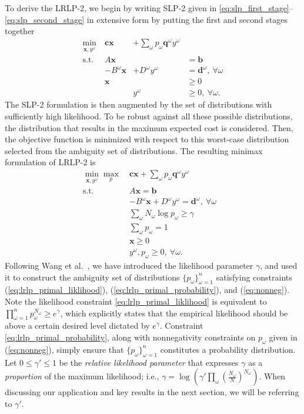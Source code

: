 \documentclass[12pt]{amsart}
\newcommand{\x}{\mathbf{x}}
\renewcommand{\c}{\mathbf{c}}
\newcommand{\q}{\mathbf{q}}
\renewcommand{\b}{\mathbf{b}}
\renewcommand{\d}{\mathbf{d}}
\newcommand{\st}{\mbox{s.t.}}
\begin{document}
To derive the LRLP-2, we begin by writing SLP-2 given in \eqref{eq:slp_first_stage}--\eqref{eq:slp_second_stage} in extensive form by putting the first and second stages together
\[
	\begin{array}{rrrl}
		\min_{\x,y^\omega} \ & \c\x & + \sum_\omega p_\omega \q^\omega y^\omega \label{eq:slp2cost} \\
		\st \ & A\x & & = \b \nonumber \\
		& -B^\omega \x & + D^\omega y^\omega & = \d^\omega,\ \forall \omega \nonumber \\
		& \x & & \geq 0 \nonumber \\
		& & y^\omega & \geq 0,\ \forall \omega. \nonumber
	\end{array}
\]
The SLP-2 formulation is then augmented by the set of distributions with sufficiently high likelihood.
To be robust against all these possible distributions, the distribution that results in the maximum expected cost is considered.
Then, the objective function is minimized with respect to this worst-case distribution selected from the ambiguity set of distributions.
The resulting minimax formulation of LRLP-2 is
\begin{align}
	\min_{\x,y^\omega} \max_p \ & \c\x + \sum_\omega p_\omega \q^\omega y^\omega \label{eq:lrlp_primal}\\
	\st \ & A\x = \b \nonumber \\
	& -B^\omega \x + D^\omega y^\omega = \d^\omega,\ \forall \omega \nonumber \\
	& \sum_\omega N_\omega \log p_\omega \geq \gamma &   \label{eq:lrlp_primal_liklihood} \\
	& \sum_\omega p_\omega = 1 &   \label{eq:lrlp_primal_probability} \\
	& \x \geq 0 \nonumber \\
	& y^\omega, p_\omega \geq 0,\ \forall \omega. \label{eq:nonneg}
\end{align}
Following Wang et al.\ \cite{wang2010likelihood}, we have introduced the likelihood parameter $\gamma$, and used it to construct the ambiguity set of distributions $\{p_\omega\}_{\omega=1}^{n}$ satisfying constraints (\ref{eq:lrlp_primal_liklihood}), (\ref{eq:lrlp_primal_probability}), and (\ref{eq:nonneg}).
Note the likelihood constraint \eqref{eq:lrlp_primal_liklihood} is equivalent to $\prod_{\omega=1}^n p_\omega^{N_\omega} \geq e^\gamma$, which explicitly states that the empirical likelihood should be above a certain desired level dictated by $e^\gamma$. 
Constraint \eqref{eq:lrlp_primal_probability}, along with nonnegativity constraints on $p_\omega$ given in (\ref{eq:nonneg}), simply ensure that $\{p_\omega\}_{\omega=1}^{n}$ constitutes a probability distribution. 
Let $0 \leq \gamma' \leq 1$ be the \emph{relative likelihood parameter} that expresses $\gamma$ as a {\it proportion} of the maximum likelihood; i.e., $\gamma = \log( \gamma' \prod_\omega (\tfrac{N_\omega}{N})^{N_\omega})$.
When discussing our application and key results in the next section, we will be referring to $\gamma'$.
\end{document}

